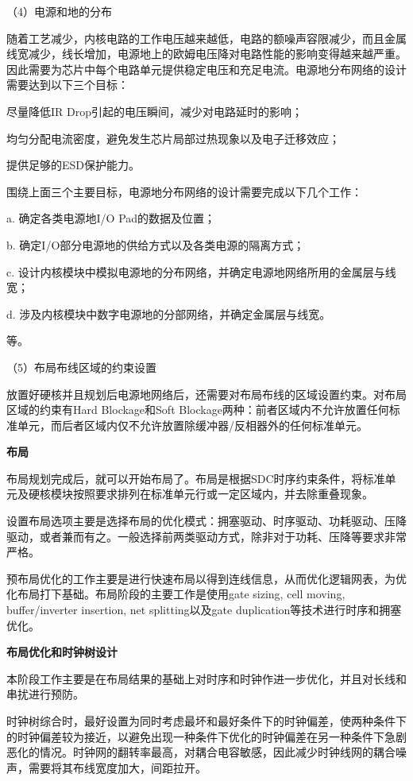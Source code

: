 \documentclass[a4paper,12pt]{report}
\begin{document}
（4）电源和地的分布

随着工艺减少，内核电路的工作电压越来越低，电路的额噪声容限减少，而且金属线宽减少，线长增加，电源地上的欧姆电压降对电路性能的影响变得越来越严重。因此需要为芯片中每个电路单元提供稳定电压和充足电流。电源地分布网络的设计需要达到以下三个目标：

尽量降低IR Drop引起的电压瞬间，减少对电路延时的影响；

均匀分配电流密度，避免发生芯片局部过热现象以及电子迁移效应；

提供足够的ESD保护能力。

围绕上面三个主要目标，电源地分布网络的设计需要完成以下几个工作：

a. 确定各类电源地I/O Pad的数据及位置；

b. 确定I/O部分电源地的供给方式以及各类电源的隔离方式；

c. 设计内核模块中模拟电源地的分布网络，并确定电源地网络所用的金属层与线宽；

d. 涉及内核模块中数字电源地的分部网络，并确定金属层与线宽。

等。

（5）布局布线区域的约束设置

放置好硬核并且规划后电源地网络后，还需要对布局布线的区域设置约束。对布局区域的约束有Hard Blockage和Soft Blockage两种：前者区域内不允许放置任何标准单元，而后者区域内仅不允许放置除缓冲器/反相器外的任何标准单元。

\noindent \textbf{布局}

布局规划完成后，就可以开始布局了。布局是根据SDC时序约束条件，将标准单元及硬核模块按照要求排列在标准单元行或一定区域内，并去除重叠现象。

设置布局选项主要是选择布局的优化模式：拥塞驱动、时序驱动、功耗驱动、压降驱动，或者兼而有之。一般选择前两类驱动方式，除非对于功耗、压降等要求非常严格。

预布局优化的工作主要是进行快速布局以得到连线信息，从而优化逻辑网表，为优化布局打下基础。布局阶段的主要工作是使用gate sizing, cell moving, buffer/inverter insertion, net splitting以及gate duplication等技术进行时序和拥塞优化。


\noindent \textbf{布局优化和时钟树设计}

本阶段工作主要是在布局结果的基础上对时序和时钟作进一步优化，并且对长线和串扰进行预防。

时钟树综合时，最好设置为同时考虑最坏和最好条件下的时钟偏差，使两种条件下的时钟偏差较为接近，以避免出现一种条件下优化的时钟偏差在另一种条件下急剧恶化的情况。时钟网的翻转率最高，对耦合电容敏感，因此减少时钟线网的耦合噪声，需要将其布线宽度加大，间距拉开。
\end{document}
